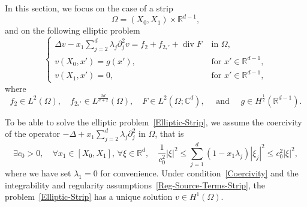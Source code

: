 \documentclass[AHL,Unicode,longabstracts]{cedram}
\newcommand*\R{\mathbb{R}}
\newcommand*\C{\mathbb{C}}
\renewcommand{\leq}{\leqslant}
\renewcommand{\div}{\operatorname{div}}
\let\oldexists\exists
\renewcommand*{\exists}{\mathrel{\oldexists}}
\let\oldforall\forall
\renewcommand*{\forall}{\mathrel{\oldforall}}
\begin{document}
In this section, we focus on the case of a strip
\begin{equation}\label{Omega=Strip}
\Omega = (X_0,X_1) \times \R^{d-1},
\end{equation}
and on the following elliptic problem
\begin{equation}\label{Elliptic-Strip}
\left\{
\begin{array}{ll}
\Delta v-x_{1} \sum\limits_{j=2}^{d} \lambda_{j} \partial_{j}^{2} v = f_2 + f_{2_*'} + \div F & \text { in } \Omega,
\\
v\left(X_{0}, x'\right)=g (x'), &\text{ for } x' \in \R^{d-1},
\\
v\left(X_{1}, x'\right)= 0, &\text{ for } x' \in \R^{d-1},
\end{array}
\right.
\end{equation}
where
\begin{equation}\label{Reg-Source-Terms-Strip}
f_2 \in L^2(\Omega),
\quad f_{2_*'} \in L^{\frac{2d}{d+2}}(\Omega),
\quad F \in L^2\left(\Omega; \C^{d}\right),
\quad\text{ and } \quad g \in H^{\frac{1}{2}}\left(\R^{d-1}\right).
\end{equation}

To be able to solve the elliptic problem~\eqref{Elliptic-Strip}, we assume the coercivity of the operator $-\Delta + x_1 \sum_{j=2}^d \lambda_j \partial_j^2$ in $\Omega$, that is
\begin{equation}\label{Coercivity}
\exists c_0 >0, \quad \forall x_1 \in [X_0, X_1],\, \forall \xi \in \R^{d}, \quad
\frac{1}{c_0^2} |\xi|^2 \leq \sum_{j =1}^d \left(1 - x_1 \lambda_j\right) |\xi_j|^2 \leq c_0^2 |\xi|^2,
\end{equation}
where we have set $\lambda_1 = 0$ for convenience. Under condition~\eqref{Coercivity} and the integrability and regularity assumptions~\eqref{Reg-Source-Terms-Strip}, the problem~\eqref{Elliptic-Strip} has a unique solution $v \in H^1(\Omega)$.
\end{document}
